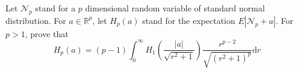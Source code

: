Let $\mathcal{N}_p$ stand for a $p$ dimensional random variable of standard normal distribution. For $a\in\mathbb{R}^p$, let $H_p(a)$ stand for the expectation $E|\mathcal{N}_p+a|$. For $p>1$, prove that
$$H_p(a)=(p-1)\int_0^{\infty} H_1\left( \frac{|a|}{\sqrt{r^2+1}}\right) \frac{r^{p-2}}{\sqrt{(r^2+1)^p}} \mathrm{d}r$$